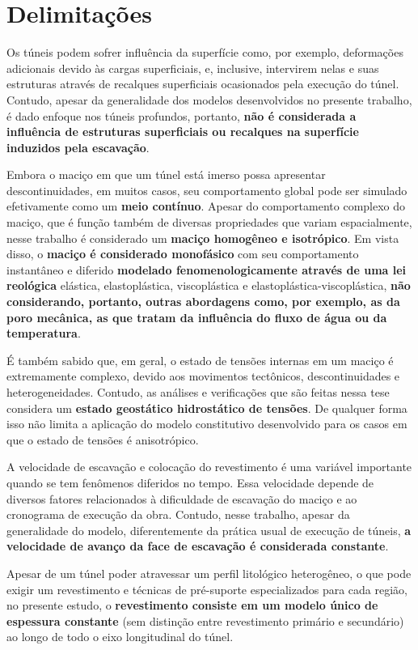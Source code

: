 \section{Delimitações}
Os túneis podem sofrer influência da superfície como, por exemplo, deformações adicionais devido às cargas superficiais, e, inclusive, intervirem nelas e suas estruturas através de recalques superficiais ocasionados pela execução do túnel. Contudo, apesar da generalidade dos modelos desenvolvidos no presente trabalho, é dado enfoque nos túneis profundos, portanto, \textbf{não é considerada a influência de estruturas superficiais ou recalques na superfície induzidos pela escavação}.

Embora o maciço em que um túnel está imerso possa apresentar descontinuidades, em muitos casos, seu comportamento global pode ser simulado efetivamente como um \textbf{meio contínuo}. Apesar do comportamento complexo do maciço, que é função também de diversas propriedades que variam espacialmente, nesse trabalho é considerado um \textbf{maciço homogêneo e isotrópico}. Em vista disso, o \textbf{maciço é considerado monofásico} com seu comportamento instantâneo e diferido \textbf{modelado fenomenologicamente através de uma lei reológica} elástica, elastoplástica, viscoplástica e elastoplástica-viscoplástica, \textbf{não considerando, portanto, outras abordagens como, por exemplo, as da poro mecânica, as que tratam da influência do fluxo de água ou da temperatura}.

É também sabido que, em geral, o estado de tensões internas em um maciço é extremamente complexo, devido aos movimentos tectônicos, descontinuidades e heterogeneidades. Contudo, as análises e verificações que são feitas nessa tese considera um \textbf{estado geostático hidrostático de tensões}. De qualquer forma isso não limita a aplicação do modelo constitutivo desenvolvido para os casos em que o estado de tensões é anisotrópico.

A velocidade de escavação e colocação do revestimento é uma variável importante quando se tem fenômenos diferidos no tempo. Essa velocidade depende de diversos fatores relacionados à dificuldade de escavação do maciço e ao cronograma de execução da obra. Contudo, nesse trabalho, apesar da generalidade do modelo, diferentemente da prática usual de execução de túneis, \textbf{a velocidade de avanço da face de escavação é considerada constante}.

Apesar de um túnel poder atravessar um perfil litológico heterogêneo, o que pode exigir um revestimento e técnicas de pré-suporte especializados para cada região, no presente estudo, o \textbf{revestimento consiste em um modelo único de espessura constante} (sem distinção entre revestimento primário e secundário) ao longo de todo o eixo longitudinal do túnel.

